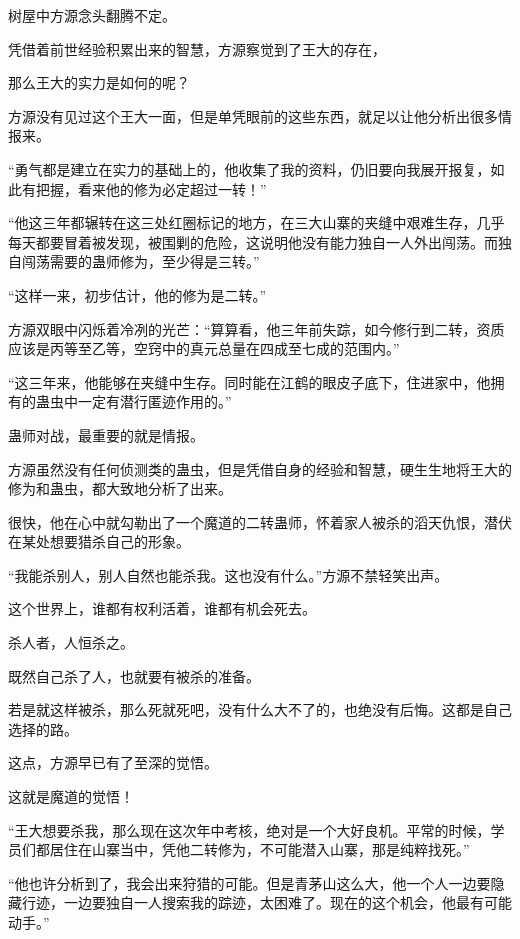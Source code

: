 
\begin{this_body}



树屋中方源念头翻腾不定。

凭借着前世经验积累出来的智慧，方源察觉到了王大的存在，

那么王大的实力是如何的呢？

方源没有见过这个王大一面，但是单凭眼前的这些东西，就足以让他分析出很多情报来。

“勇气都是建立在实力的基础上的，他收集了我的资料，仍旧要向我展开报复，如此有把握，看来他的修为必定超过一转！”

“他这三年都辗转在这三处红圈标记的地方，在三大山寨的夹缝中艰难生存，几乎每天都要冒着被发现，被围剿的危险，这说明他没有能力独自一人外出闯荡。而独自闯荡需要的蛊师修为，至少得是三转。”

“这样一来，初步估计，他的修为是二转。”

方源双眼中闪烁着冷冽的光芒：“算算看，他三年前失踪，如今修行到二转，资质应该是丙等至乙等，空窍中的真元总量在四成至七成的范围内。”

“这三年来，他能够在夹缝中生存。同时能在江鹤的眼皮子底下，住进家中，他拥有的蛊虫中一定有潜行匿迹作用的。”

蛊师对战，最重要的就是情报。

方源虽然没有任何侦测类的蛊虫，但是凭借自身的经验和智慧，硬生生地将王大的修为和蛊虫，都大致地分析了出来。

很快，他在心中就勾勒出了一个魔道的二转蛊师，怀着家人被杀的滔天仇恨，潜伏在某处想要猎杀自己的形象。

“我能杀别人，别人自然也能杀我。这也没有什么。”方源不禁轻笑出声。

这个世界上，谁都有权利活着，谁都有机会死去。

杀人者，人恒杀之。

既然自己杀了人，也就要有被杀的准备。

若是就这样被杀，那么死就死吧，没有什么大不了的，也绝没有后悔。这都是自己选择的路。

这点，方源早已有了至深的觉悟。

这就是魔道的觉悟！

“王大想要杀我，那么现在这次年中考核，绝对是一个大好良机。平常的时候，学员们都居住在山寨当中，凭他二转修为，不可能潜入山寨，那是纯粹找死。”

“他也许分析到了，我会出来狩猎的可能。但是青茅山这么大，他一个人一边要隐藏行迹，一边要独自一人搜索我的踪迹，太困难了。现在的这个机会，他最有可能动手。”


\end{this_body}
